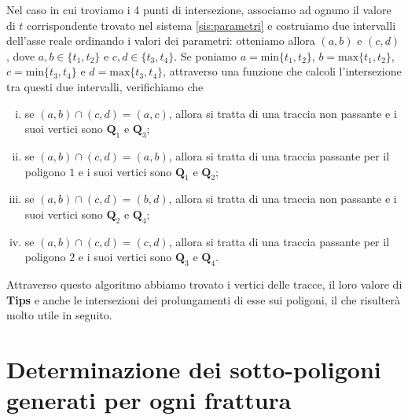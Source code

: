 \documentclass[a4paper]{article}
\newcommand{\B}{\mathbf}
\begin{document}
Nel caso in cui troviamo i 4 punti di intersezione, associamo ad ognuno il valore di $t$ corrispondente trovato nel sistema \eqref{sis:parametri} e costruiamo due intervalli dell'asse reale ordinando i valori dei parametri: otteniamo allora $(a,b)$ e $(c,d)$, dove $a,b\in\{t_1,t_2\}$ e $c,d\in\{t_3,t_4\}$. Se poniamo $a=\text{min}\{t_1,t_2\}$, $b=\text{max}\{t_1,t_2\}$, $c=\text{min}\{t_3,t_4\}$ e $d=\text{max}\{t_3,t_4\}$, attraverso una funzione che calcoli l'intersezione tra questi due intervalli, verifichiamo che
\begin{enumerate} [(i)]
\item se $(a,b)\cap(c,d)=(a,c)$, allora si tratta di una traccia non passante e i suoi vertici sono $\B{Q}_1$ e $\B{Q}_3$;
\item se $(a,b)\cap(c,d)=(a,b)$, allora si tratta di una traccia passante per il poligono $1$ e i suoi vertici sono $\B{Q}_1$ e $\B{Q}_2$;
\item se $(a,b)\cap(c,d)=(b,d)$, allora si tratta di una traccia non passante e i suoi vertici sono $\B{Q}_2$ e $\B{Q}_4$;
\item se $(a,b)\cap(c,d)=(c,d)$, allora si tratta di una traccia passante per il poligono $2$ e i suoi vertici sono $\B{Q}_3$ e $\B{Q}_4$.
\end{enumerate}
Attraverso questo algoritmo abbiamo trovato i vertici delle tracce, il loro valore di \textbf{Tips} e anche le intersezioni dei prolungamenti di esse sui poligoni, il che risulterà molto utile in seguito.

\section{Determinazione dei sotto-poligoni generati per ogni frattura}
\end{document}
